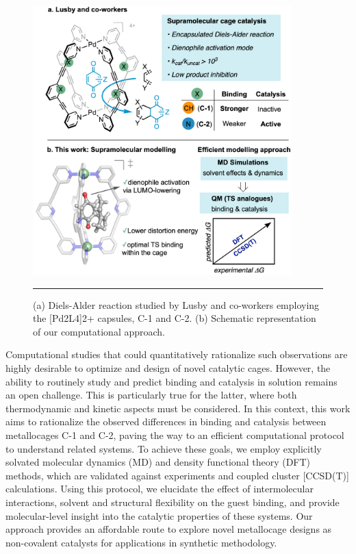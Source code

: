 \documentclass[../../main.tex]{subfiles}
\begin{document}
\begin{figure}[h!]
	\vspace{0.4cm}
	\centering
	\includegraphics[width=10cm]{3/da//figs/fig1/fig1}
	\vspace{0.2cm}
	\hrule
	\caption{(a) Diels-Alder reaction studied by Lusby and co-workers employing the [Pd2L4]2+ capsules, C-1 and C-2. (b) Schematic representation of our computational approach.}
	\label{fig::da_1}
\end{figure}

Computational studies that could quantitatively rationalize such observations are highly desirable to optimize and design of novel catalytic cages. However, the ability to routinely study and predict binding and catalysis in solution remains an open challenge. This is particularly true for the latter, where both thermodynamic and kinetic aspects must be considered. In this context, this work aims to rationalize the observed differences in binding and catalysis between metallocages C-1 and C-2, paving the way to an efficient computational protocol to understand related systems. To achieve these goals, we employ explicitly solvated molecular dynamics (MD) and density functional theory (DFT) methods, which are validated against experiments and coupled cluster [CCSD(T)] calculations. Using this protocol, we elucidate the effect of intermolecular interactions, solvent and structural flexibility on the guest binding, and provide molecular-level insight into the catalytic properties of these systems. Our approach provides an affordable route to explore novel metallocage designs as non-covalent catalysts for applications in synthetic methodology.
\end{document}
